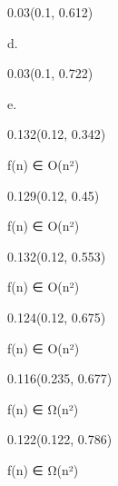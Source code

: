\documentclass[aspectratio=169]{beamer}
\begin{document}
\begin{frame}[fragile]
\begin{textblock}{0.03}(0.1, 0.612)
  \begin{minipage}[t][0.054\paperheight]{\linewidth}
    {\tiny d.}
  \end{minipage}
\end{textblock}

\begin{textblock}{0.03}(0.1, 0.722)
  \begin{minipage}[t][0.054\paperheight]{\linewidth}
    {\tiny e.}
  \end{minipage}
\end{textblock}

\begin{textblock}{0.132}(0.12, 0.342)
  \begin{minipage}[t][0.054\paperheight]{\linewidth}
    {\tiny f(n) ∈ O(n²)}
  \end{minipage}
\end{textblock}

\begin{textblock}{0.129}(0.12, 0.45)
  \begin{minipage}[t][0.054\paperheight]{\linewidth}
    {\tiny f(n) ∈ O(n²)}
  \end{minipage}
\end{textblock}

\begin{textblock}{0.132}(0.12, 0.553)
  \begin{minipage}[t][0.054\paperheight]{\linewidth}
    {\tiny f(n) ∈ O(n²)}
  \end{minipage}
\end{textblock}

\begin{textblock}{0.124}(0.12, 0.675)
  \begin{minipage}[t][0.054\paperheight]{\linewidth}
    {\tiny f(n) ∈ O(n²)}
  \end{minipage}
\end{textblock}

\begin{textblock}{0.116}(0.235, 0.677)
  \begin{minipage}[t][0.054\paperheight]{\linewidth}
    {\tiny f(n) ∈ Ω(n²)}
  \end{minipage}
\end{textblock}

\begin{textblock}{0.122}(0.122, 0.786)
  \begin{minipage}[t][0.054\paperheight]{\linewidth}
    {\tiny f(n) ∈ Ω(n²)}
  \end{minipage}
\end{textblock}


\end{frame}
\end{document}
